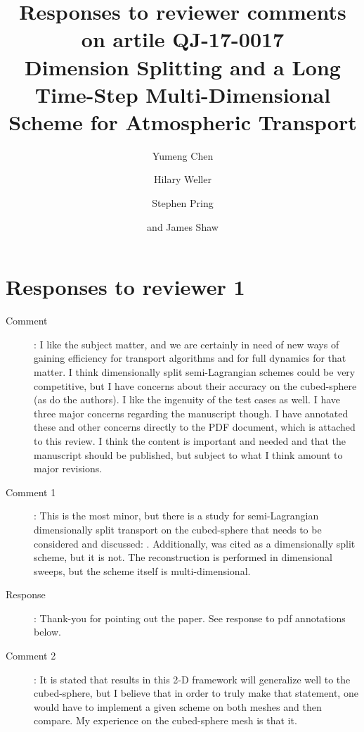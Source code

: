 \documentclass[12pt]{article}
\begin{document}
\title{Responses to reviewer comments on artile QJ-17-0017\\
Dimension Splitting and a Long Time-Step Multi-Dimensional Scheme for Atmospheric Transport}
\author{Yumeng Chen \and Hilary Weller \and Stephen Pring \and and James Shaw}
\maketitle

\section*{Responses to reviewer 1}

\begin{description}

\item [Comment]:
I like the subject matter, and we are certainly in need of new ways of gaining efficiency for transport algorithms and for full dynamics for that matter. I think dimensionally split semi-Lagrangian schemes could be very competitive, but I have concerns about their accuracy on the cubed-sphere (as do the authors). I like the ingenuity of the test cases as well. I have three major concerns regarding the manuscript though. I have annotated these and other concerns directly to the PDF document, which is attached to this review. I think the content is important and needed and that the manuscript should be published, but subject to what I think amount to major revisions.

\item [Comment 1]: This is the most minor, but there is a study for semi-Lagrangian dimensionally split transport on the cubed-sphere that needs to be considered and discussed: \cite{GNQ14}. Additionally, \cite{KNK15} was cited as a dimensionally split scheme, but it is not. The reconstruction is performed in dimensional sweeps, but the scheme itself is multi-dimensional.

\item [Response]: 
Thank-you for pointing out the \cite{GNQ14} paper. See response to pdf annotations below.

\item [Comment 2]:
It is stated that results in this 2-D framework will generalize well to the cubed-sphere, but I believe that in order to truly make that statement, one would have to implement a given scheme on both meshes and then compare. My experience on the cubed-sphere mesh is that it.


\end{description}
\end{document}

